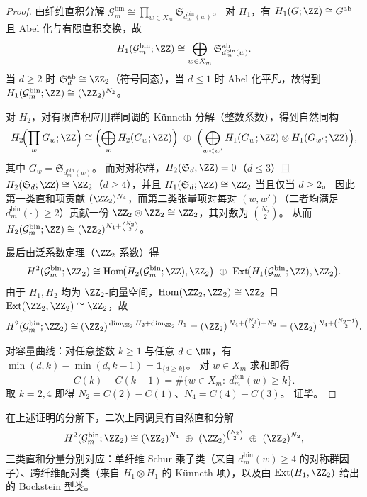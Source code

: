 \begin{proof}
由纤维直积分解
\(
\mathcal{G}^{\mathrm{bin}}_m\cong \prod_{w\in X_m}\mathfrak{S}_{d^{\mathrm{bin}}_m(w)}
\)。
对 \(H_1\)，有
\(
H_1(G;\ZZ)\cong G^{\mathrm{ab}}
\)
且 Abel 化与有限直积交换，故
\[
H_1(\mathcal{G}^{\mathrm{bin}}_m;\ZZ)
\cong
\bigoplus_{w\in X_m}\mathfrak{S}_{d^{\mathrm{bin}}_m(w)}^{\mathrm{ab}}.
\]
当 \(d\ge 2\) 时 \(\mathfrak{S}_d^{\mathrm{ab}}\cong\ZZ_2\)（符号同态），当 \(d\le 1\) 时 Abel 化平凡，故得到
\(
H_1(\mathcal{G}^{\mathrm{bin}}_m;\ZZ)\cong (\ZZ_2)^{N_2}
\)。
\par
对 \(H_2\)，对有限直积应用群同调的 K\"unneth 分解（整数系数），得到自然同构
\[
H_2\!\Bigl(\prod_{w}G_w;\ZZ\Bigr)
\cong
\Bigl(\bigoplus_{w}H_2(G_w;\ZZ)\Bigr)\ \oplus\
\Bigl(\bigoplus_{w<w'}H_1(G_w;\ZZ)\otimes H_1(G_{w'};\ZZ)\Bigr),
\]
其中 \(G_w=\mathfrak{S}_{d^{\mathrm{bin}}_m(w)}\)。
而对对称群，\(H_2(\mathfrak{S}_d;\ZZ)=0\)（\(d\le 3\)）且 \(H_2(\mathfrak{S}_d;\ZZ)\cong\ZZ_2\)（\(d\ge 4\)），并且 \(H_1(\mathfrak{S}_d;\ZZ)\cong\ZZ_2\) 当且仅当 \(d\ge 2\)。
因此第一类直和项贡献 \((\ZZ_2)^{N_4}\)，而第二类张量项对每对 \((w,w')\)（二者均满足 \(d^{\mathrm{bin}}_m(\cdot)\ge 2\)）贡献一份
\(
\ZZ_2\otimes\ZZ_2\cong\ZZ_2
\)，其对数为 \(\binom{N_2}{2}\)。
从而
\(
H_2(\mathcal{G}^{\mathrm{bin}}_m;\ZZ)\cong (\ZZ_2)^{N_4+\binom{N_2}{2}}
\)。
\par
最后由泛系数定理（\(\ZZ_2\) 系数）得
\[
H^2(\mathcal{G}^{\mathrm{bin}}_m;\ZZ_2)
\cong
\mathrm{Hom}\!\bigl(H_2(\mathcal{G}^{\mathrm{bin}}_m;\ZZ),\ZZ_2\bigr)\ \oplus\
\mathrm{Ext}\!\bigl(H_1(\mathcal{G}^{\mathrm{bin}}_m;\ZZ),\ZZ_2\bigr).
\]
由于 \(H_1,H_2\) 均为 \(\ZZ_2\)-向量空间，\(\mathrm{Hom}(\ZZ_2,\ZZ_2)\cong\ZZ_2\) 且 \(\mathrm{Ext}(\ZZ_2,\ZZ_2)\cong\ZZ_2\)，故
\[
H^2(\mathcal{G}^{\mathrm{bin}}_m;\ZZ_2)
\cong
(\ZZ_2)^{\,\dim_{\ZZ_2}H_2+\dim_{\ZZ_2}H_1}
=
(\ZZ_2)^{\,N_4+\binom{N_2}{2}+N_2}
=
(\ZZ_2)^{\,N_4+\binom{N_2+1}{2}}.
\]
\par
对容量曲线：对任意整数 \(k\ge 1\) 与任意 \(d\in\NN\)，有
\(
\min(d,k)-\min(d,k-1)=\mathbf 1_{\{d\ge k\}}
\)。
对 \(w\in X_m\) 求和即得
\[
C(k)-C(k-1)=\#\{w\in X_m:\ d^{\mathrm{bin}}_m(w)\ge k\}.
\]
取 \(k=2,4\) 即得 \(N_2=C(2)-C(1)\)、\(N_4=C(4)-C(3)\)。
证毕。
\end{proof}

\begin{remark}\label{rem:window6-foldbin-gauge-h2-generators}
在上述证明的分解下，二次上同调具有自然直和分解
\[
H^2(\mathcal{G}^{\mathrm{bin}}_m;\ZZ_2)
\cong
(\ZZ_2)^{N_4}\ \oplus\ (\ZZ_2)^{\binom{N_2}{2}}\ \oplus\ (\ZZ_2)^{N_2},
\]
三类直和分量分别对应：单纤维 Schur 乘子类（来自 \(d^{\mathrm{bin}}_m(w)\ge 4\) 的对称群因子）、跨纤维配对类（来自 \(H_1\otimes H_1\) 的 K\"unneth 项），以及由
\(\mathrm{Ext}(H_1,\ZZ_2)\)
给出的 Bockstein 型类。
\end{remark}

\endinput
